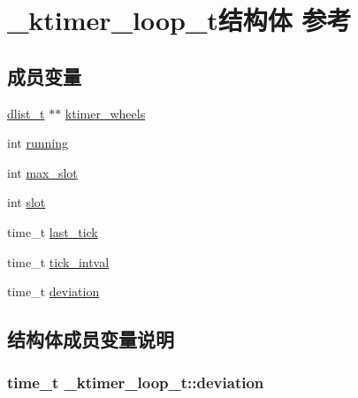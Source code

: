 \hypertarget{a00024}{}\section{\+\_\+ktimer\+\_\+loop\+\_\+t结构体 参考}
\label{a00024}
\subsection*{成员变量}
\begin{DoxyCompactItemize}
\item 
\hyperlink{a00051_ad6644d67df4b4e3596c1eb12977d1d16_ad6644d67df4b4e3596c1eb12977d1d16}{dlist\+\_\+t} $\ast$$\ast$ \hyperlink{a00024_af68f6f946f2b3583d04d8a459b738d29_af68f6f946f2b3583d04d8a459b738d29}{ktimer\+\_\+wheels}
\item 
int \hyperlink{a00024_aab0b79491b93f3752c93dfb1d8c60e66_aab0b79491b93f3752c93dfb1d8c60e66}{running}
\item 
int \hyperlink{a00024_aeb8772fdff5de87ce1db9878f1357043_aeb8772fdff5de87ce1db9878f1357043}{max\+\_\+slot}
\item 
int \hyperlink{a00024_ae54f1df7a355b968dcc9baf7dca10a8d_ae54f1df7a355b968dcc9baf7dca10a8d}{slot}
\item 
time\+\_\+t \hyperlink{a00024_aa0cf5e5f3b5532aa4335d25831c9d2c3_aa0cf5e5f3b5532aa4335d25831c9d2c3}{last\+\_\+tick}
\item 
time\+\_\+t \hyperlink{a00024_a5bfbb75720e6a5310417980347763c82_a5bfbb75720e6a5310417980347763c82}{tick\+\_\+intval}
\item 
time\+\_\+t \hyperlink{a00024_a868b5369122bc5b595427a8c060249fc_a868b5369122bc5b595427a8c060249fc}{deviation}
\end{DoxyCompactItemize}


\subsection{结构体成员变量说明}
\hypertarget{a00024_a868b5369122bc5b595427a8c060249fc_a868b5369122bc5b595427a8c060249fc}{}
\subsubsection[{deviation}]{\setlength{\rightskip}{0pt plus 5cm}time\+\_\+t \+\_\+ktimer\+\_\+loop\+\_\+t\+::deviation}\label{a00024_a868b5369122bc5b595427a8c060249fc_a868b5369122bc5b595427a8c060249fc}
\hypertarget{a00024_af68f6f946f2b3583d04d8a459b738d29_af68f6f946f2b3583d04d8a459b738d29}{}
